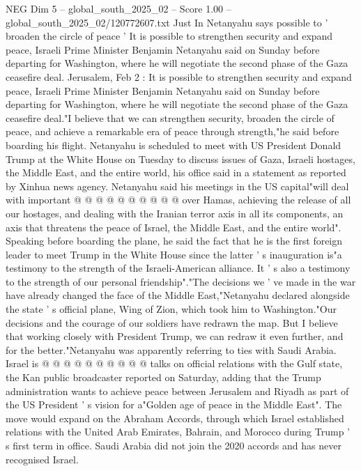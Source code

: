 \begin{textsample}{NEG Dim 5 – global\_south\_2025\_02 – Score 1.00 – global\_south\_2025\_02/120772607.txt}  \label{ex:f5_neg_309}
Just In Netanyahu says possible to ' broaden the circle of peace ' It is possible to strengthen security and expand peace, Israeli Prime Minister Benjamin Netanyahu said on Sunday before departing for Washington, where he will negotiate the second phase of the Gaza ceasefire deal.
Jerusalem, Feb 2 : It is possible to strengthen security and expand peace, Israeli Prime Minister Benjamin Netanyahu said on Sunday before departing for Washington, where he will negotiate the second phase of the Gaza ceasefire deal."I believe that we can strengthen security, broaden the circle of peace, and achieve a remarkable era of peace through strength,"he said before boarding his flight.
Netanyahu is scheduled to meet with US President Donald Trump at the White House on Tuesday to discuss issues of Gaza, Israeli hostages, the Middle East, and the entire world, his office said in a statement as reported by Xinhua news agency.
Netanyahu said his meetings in the US capital"will deal with important @ @ @ @ @ @ @ @ @ @ over Hamas, achieving the release of all our hostages, and dealing with the Iranian terror axis in all its components, an axis that threatens the peace of Israel, the Middle East, and the entire world".
Speaking before boarding the plane, he said the fact that he is the first foreign leader to meet Trump in the White House since the latter ' s inauguration is"a testimony to the strength of the Israeli-American alliance.
It ' s also a testimony to the strength of our personal friendship"."The decisions we ' ve made in the war have already changed the face of the Middle East,"Netanyahu declared alongside the state ' s official plane, Wing of Zion, which took him to Washington."Our decisions and the courage of our soldiers have redrawn the map.
But I believe that working closely with President Trump, we can redraw it even further, and for the better."Netanyahu was apparently referring to ties with Saudi Arabia.
Israel is @ @ @ @ @ @ @ @ @ @ talks on official relations with the Gulf state, the Kan public broadcaster reported on Saturday, adding that the Trump administration wants to achieve peace between Jerusalem and Riyadh as part of the US President ' s vision for a"Golden age of peace in the Middle East".
The move would expand on the Abraham Accords, through which Israel established relations with the United Arab Emirates, Bahrain, and Morocco during Trump ' s first term in office.
Saudi Arabia did not join the 2020 accords and has never recognised Israel.

\end{textsample}
